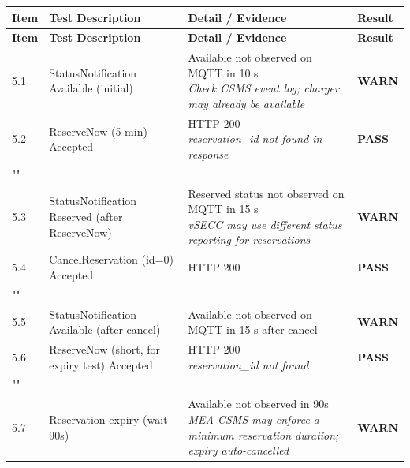 \documentclass[10pt, a4paper]{article}
\begin{document}
\renewcommand{\arraystretch}{1.35}
\begin{longtable}{|L{1cm}|L{5.5cm}|M{7cm}|C{1.8cm}|}
\hline
{}
\textbf{Item} & \small\textbf{Test Description} & \small\textbf{Detail / Evidence} & \small\textbf{Result} \\
\hline
\endfirsthead
\hline
{}
\textbf{Item} & \small\textbf{Test Description} & \small\textbf{Detail / Evidence} & \small\textbf{Result} \\
\hline
\endhead
\hline
\endfoot
\small 5.1 & \small StatusNotification Available (initial) & Available not observed on MQTT in 10 s{\newline\normalfont\footnotesize\itshape Check CSMS event log; charger may already be available} & \textcolor{warnorange}{\textbf{WARN}} \\
\hline
\small 5.2 & \small ReserveNow (5 min)  Accepted & HTTP 200{\newline\normalfont\footnotesize\itshape reservation\_id not found in response} & \textcolor{passgreen}{\textbf{PASS}} \\
\hline
{} \\
\hline
\small 5.3 & \small StatusNotification Reserved (after ReserveNow) & Reserved status not observed on MQTT in 15 s{\newline\normalfont\footnotesize\itshape vSECC may use different status reporting for reservations} & \textcolor{warnorange}{\textbf{WARN}} \\
\hline
\small 5.4 & \small CancelReservation (id=0)  Accepted & HTTP 200 & \textcolor{passgreen}{\textbf{PASS}} \\
\hline
{} \\
\hline
\small 5.5 & \small StatusNotification Available (after cancel) & Available not observed on MQTT in 15 s after cancel & \textcolor{warnorange}{\textbf{WARN}} \\
\hline
\small 5.6 & \small ReserveNow (short, for expiry test)  Accepted & HTTP 200{\newline\normalfont\footnotesize\itshape reservation\_id not found} & \textcolor{passgreen}{\textbf{PASS}} \\
\hline
{} \\
\hline
\small 5.7 & \small Reservation expiry (wait 90s) & Available not observed in 90s{\newline\normalfont\footnotesize\itshape MEA CSMS may enforce a minimum reservation duration; expiry auto-cancelled} & \textcolor{warnorange}{\textbf{WARN}} \\

\end{longtable}
\end{document}
